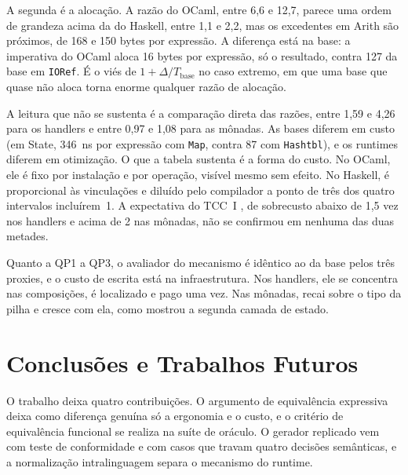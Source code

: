 \documentclass[12pt]{article}
\newcommand{\BaseByHaskellArith}{127}
\newcommand{\BaseByOcamlArith}{16}
\newcommand{\BaseNsHaskellState}{346}
\newcommand{\BaseNsOcamlState}{87}
\newcommand{\DeltaByHaskellArith}{150}
\newcommand{\DeltaByOcamlArith}{168}
\newcommand{\FaixaRAHaskell}{1,1 e 2,2}
\newcommand{\FaixaRAOcaml}{6,6 e 12,7}
\newcommand{\FaixaRTHaskell}{0,97 e 1,08}
\newcommand{\FaixaRTOcaml}{1,59 e 4,26}
\begin{document}
A segunda é a alocação. A razão do OCaml, entre \FaixaRAOcaml{}, parece uma
ordem de grandeza acima da do Haskell, entre \FaixaRAHaskell{}, mas os
excedentes em Arith são próximos, de \DeltaByOcamlArith{} e
\DeltaByHaskellArith{} bytes por expressão. %
A diferença está na base: a imperativa do OCaml aloca \BaseByOcamlArith{}
bytes por expressão, só o resultado, contra \BaseByHaskellArith{} da base em
\texttt{IORef}. %
É o viés de $1+\Delta/T_{\mathrm{base}}$ no caso extremo, em que uma base que
quase não aloca torna enorme qualquer razão de alocação.

A leitura que não se sustenta é a comparação direta das razões, entre
\FaixaRTOcaml{} para os handlers e entre \FaixaRTHaskell{} para as
mônadas. %
As bases diferem em custo (em State, \BaseNsHaskellState{}~ns por
expressão com \texttt{Map}, contra \BaseNsOcamlState{} com
\texttt{Hashtbl}), %
e os runtimes diferem em otimização. O que a tabela sustenta é a forma do
custo. No OCaml, ele é fixo por instalação e por operação, visível mesmo sem efeito.
No Haskell, é proporcional às vinculações e diluído pelo compilador a ponto de
três dos quatro intervalos incluírem~1. A expectativa do TCC~I
\cite{marchioni:tcc1}, de sobrecusto abaixo de 1,5 vez nos handlers e
acima de 2 nas mônadas, não se confirmou em nenhuma das duas metades. %

Quanto a QP1 a QP3, o avaliador do mecanismo é idêntico ao da base pelos três
proxies, e o custo de escrita está na infraestrutura. Nos
handlers, ele se concentra nas composições, é localizado e pago uma
vez. Nas mônadas, recai sobre o tipo da pilha e cresce com ela, como mostrou a
segunda camada de estado.

\section{Conclusões e Trabalhos Futuros}\label{sec:consideracoes}

O trabalho deixa quatro contribuições. O argumento de equivalência expressiva
deixa como diferença genuína só a ergonomia e o custo, e o critério de
equivalência funcional se realiza na suíte de oráculo. O gerador replicado vem
com teste de conformidade e com casos que travam quatro decisões semânticas, e
a normalização intralinguagem separa o mecanismo do runtime.
\end{document}
